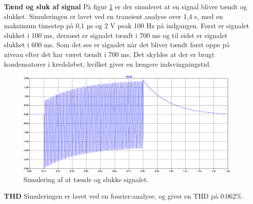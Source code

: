 \textbf{Tænd og sluk af signal}
\newline
På figur \ref{indgangsvaelger_taendsluk} er der simuleret at en signal bliver tændt og slukket. Simuleringen er lavet ved en transient analyse over 1,4 s, med en maksimum timestep på 0,1 µs og 2 V peak 100 Hz på indgangen. Først er signalet slukket i 100 ms, dernæst er signalet tændt i 700 ms og til sidst er signalet slukket i 600 ms. Som det ses er signalet når det bliver tændt først oppe på niveau efter det har været tændt i 700 ms. Det skyldes at der er brugt kondensatorer i kredsløbet, hvilket giver en længere indsvingningstid.
\begin{figure}[h]
\centering
\includegraphics[scale=0.3]{teknisk/indgangsvaelger/simulering/taend_sluk.png}
\caption{Simulering af at tænde og slukke signalet.}
\label{indgangsvaelger_taendsluk}
\end{figure}

\textbf{THD}
\newline
Simuleringen er lavet ved en fourier-analyse, og giver en THD på 0.062\%.
